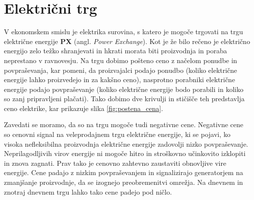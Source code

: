 \documentclass[12pt,a4paper]{amsart}
\theoremstyle{definition} %
\theoremstyle{plain} %
\begin{document}
{\section*{Električni trg}

V ekonomskem smislu je elektrika surovina, s katero je mogoče trgovati na trgu električne energije \textbf{PX} (angl. \textit{Power Exchange}). Kot je že bilo rečeno je električno energijo zelo težko shranjevati in hkrati morata biti proizvodnja in poraba neprestano v ravnovesju.
 Na trgu dobimo pošteno ceno z načelom ponudbe in povpraševanja, kar pomeni, da proizvajalci podajo ponudbo (koliko električne energije lahko proizvedejo in za kakšno ceno), nasprotno porabniki električne energije podajo povpraševanje (koliko električne energije bodo porabili in koliko so zanj pripravljeni plačati). 
Tako dobimo dve krivulji in stičišče teh predstavlja ceno elektrike, kar prikazuje slika \ref{fig:postena_cena}.  Zavedati se moramo, da so na trgu mogoče tudi negativne cene.
 Negativne cene so cenovni signal na veleprodajnem trgu električne energije, ki se pojavi, ko visoka nefleksibilna proizvodnja električne energije zadovolji nizko povpraševanje. Neprilagodljivih virov energije ni mogoče hitro in stroškovno učinkovito izklopiti in znova zagnati. Prav tako je cenovno zahtevno zaustaviti obnovljive vire energije.  
 Cene padajo z nizkim povpraševanjem in signalizirajo generatorjem na zmanjšanje proizvodnje, da se izognejo preobremenitvi omrežja. Na dnevnem in znotraj dnevnem trgu lahko tako cene padejo pod ničlo.

}
\end{document}
